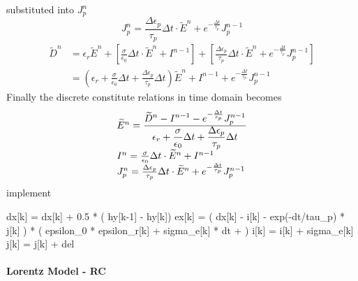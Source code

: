 substituted into $J_p^n$
\begin{equation}
  J_p^n = \frac{\Delta\epsilon_p}{\tau_p}\Delta t\cdot\widetilde{E}^n + e^{-\frac{\Delta t}{\tau_p}} J_p^{n-1}
\end{equation}
\begin{equation}
  \begin{split}
    \widetilde{D}^n & = \epsilon_r\widetilde{E}^n + \left[\frac{\sigma}{\epsilon_0}\Delta t\cdot\widetilde{E}^n + I^{n-1}\right] + \left[\frac{\Delta \epsilon_p}{\tau_p}\Delta t\cdot\widetilde{E}^n + e^{-\frac{\Delta t}{\tau_p}} J_p^{n-1}\right]\\
    & = \left(\epsilon_r + \frac{\sigma}{\epsilon_0}\Delta t + \frac{\Delta\epsilon_p}{\tau_p}\Delta t\right)\widetilde{E}^n + I^{n-1} + e^{-\frac{\Delta t}{\tau_p}} J_p^{n-1}
  \end{split}
\end{equation}
Finally the discrete constitute relations in time domain becomes
\begin{gather}
  \begin{array}{@{}l@{}}
    \widetilde{E}^n =  \frac{\displaystyle \widetilde{D}^n - I^{n-1} - e^{-\frac{\Delta t}{\tau_p}}J_p^{n-1} }{\displaystyle \epsilon_r + \frac{\sigma}{\epsilon_0}\Delta t + \frac{\Delta \epsilon_p}{\tau_p} \Delta t}\\    
    I^n = \frac{\sigma}{\epsilon_0}\Delta t\cdot\widetilde{E}^n + I^{n-1}\\
    J_p^n = \frac{\Delta\epsilon_p}{\tau_p}\Delta t\cdot\widetilde{E}^n + e^{-\frac{\Delta t}{\tau_p}} J_p^{n-1}
  \end{array}
\end{gather}
implement
\begin{code}
  dx[k] = dx[k] + 0.5 * ( hy[k-1] - hy[k])
  ex[k] = ( dx[k] - i[k] - exp(-dt/tau_p) * j[k] ) 
  * ( epsilon_0 * epsilon_r[k] + sigma_e[k] * dt +  )
  i[k] = i[k] + sigma_e[k] 
  j[k] = j[k] + del
\end{code}






\paragraph{{\msjh Lorentz Model - RC}}


